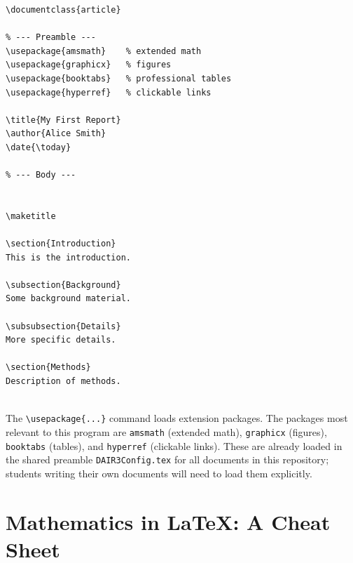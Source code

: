 \begin{lstlisting}[style=inlineStyle, caption={Minimal compilable document with preamble and sectioning}]
\documentclass{article}

% --- Preamble ---
\usepackage{amsmath}    % extended math
\usepackage{graphicx}   % figures
\usepackage{booktabs}   % professional tables
\usepackage{hyperref}   % clickable links

\title{My First Report}
\author{Alice Smith}
\date{\today}

% --- Body ---


\maketitle

\section{Introduction}
This is the introduction.

\subsection{Background}
Some background material.

\subsubsection{Details}
More specific details.

\section{Methods}
Description of methods.


\end{lstlisting}

The \verb|\usepackage{...}| command loads extension packages. The
packages most relevant to this program are \texttt{amsmath} (extended
math), \texttt{graphicx} (figures), \texttt{booktabs} (tables), and
\texttt{hyperref} (clickable links). These are already loaded in the
shared preamble \texttt{DAIR3Config.tex} for all documents in this
repository; students writing their own documents will need to load
them explicitly.

\section{Mathematics in \LaTeX{}: A Cheat Sheet}
\label{sec:latex-math}

